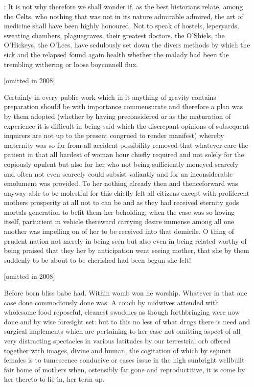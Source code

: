 
:
It is not why therefore we shall wonder if,
as the best historians
relate,
among the Celts,
who nothing that was not in its nature admirable
admired,
the art of medicine shall have been highly honoured.
Not to speak
of hostels,
leperyards,
sweating chambers,
plaguegraves,
their greatest
doctors,
the O'Shiels,
the O'Hickeys,
the O'Lees,
have sedulously set down
the divers methods by which the sick and the relapsed found again health
whether the malady had been the trembling withering or loose boyconnell
flux.

[omitted in 2008]

Certainly in every public work which in it anything of gravity contains
preparation should be with importance commensurate and therefore a plan
was by them adopted (whether by having preconsidered or as the
maturation of experience it is difficult in being said which the
discrepant opinions of subsequent inquirers are not up to the present
congrued to render manifest) whereby maternity was so far from all
accident possibility removed that whatever care the patient in that all
hardest of woman hour chiefly required and not solely for the copiously
opulent but also for her who not being sufficiently moneyed scarcely and
often not even scarcely could subsist valiantly and for an
inconsiderable emolument was provided.
To her nothing already then and
thenceforward was anyway able to be molestful for this chiefly felt all
citizens except with proliferent mothers prosperity at all not to can be
and as they had received eternity gods mortals generation to befit them
her beholding,
when the case was so hoving itself,
parturient in vehicle
thereward carrying desire immense among all one another was impelling on
of her to be received into that domicile.
O thing of prudent nation not
merely in being seen but also even in being related worthy of being
praised that they her by anticipation went seeing mother,
that she by
them suddenly to be about to be cherished had been begun she felt!



[omitted in 2008]

Before born bliss babe had.
Within womb won he worship.
Whatever
in that one case done commodiously done was.
A couch by midwives
attended with wholesome food reposeful,
cleanest swaddles as though
forthbringing were now done and by wise foresight set:
but to this no less
of what drugs there is need and surgical implements which are pertaining
to her case not omitting aspect of all very distracting spectacles in
various latitudes by our terrestrial orb offered together with images,
divine and human,
the cogitation of which by sejunct females is to
tumescence conducive or eases issue in the high sunbright wellbuilt fair
home of mothers when,
ostensibly far gone and reproductitive,
it is come
by her thereto to lie in,
her term up.

